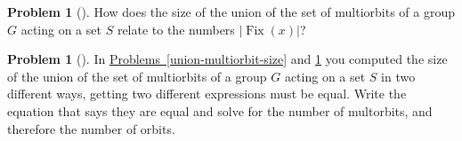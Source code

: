 \documentclass[10pt,]{book}
\theoremstyle{plain}
\theoremstyle{definition}
\newtheorem{activity}[project]{Problem}
\theoremstyle{definition}
\numberwithin{equation}{chapter}
\DeclareMathOperator{\Fix}{Fix}
\begin{document}
\begin{activity}[] \label{union-multiorbit-fix}
\hypertarget{p-1683}{}%
How does the size of the union of the set of multiorbits of a group \(G\) acting on a set \(S\) relate to the numbers \(|\Fix(x)|\)?%
\end{activity}
\begin{activity}[] \label{numbermultiorbits3}
\hypertarget{p-1685}{}%
In \hyperref[union-multiorbit-size]{Problems~\ref{union-multiorbit-size}} and \hyperref[union-multiorbit-fix]{\ref{union-multiorbit-fix}} you computed the size of the union of the set of multiorbits of a group \(G\) acting on a set \(S\) in two different ways, getting two different expressions must be equal. Write the equation that says they are equal and solve for the number of multorbits, and therefore the number of orbits.%
\end{activity}
\typeout{************************************************}
\typeout{************************************************}
\end{document}
